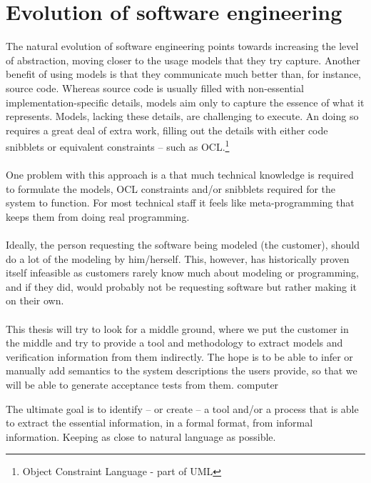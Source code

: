\documentclass[10pt]{scrreprt}
\begin{document}
\section{Evolution of software engineering}
The natural evolution of software engineering points towards increasing the level of abstraction, moving closer to the usage models that they try capture. Another benefit of using models is that they communicate much better than, for instance, source code. Whereas source code is usually filled with non-essential implementation-specific details, models aim only to capture the essence of what it represents. Models, lacking these details, are challenging to execute. An doing so requires a great deal of extra work, filling out the details with either code snibblets or equivalent constraints -- such as OCL.\footnote{Object Constraint Language - part of UML}\\\\
One problem with this approach is a that much technical knowledge is required to formulate the models, OCL constraints and/or snibblets required for the system to function. For most technical staff it feels like meta-programming that keeps them from doing real programming.
\\\\
Ideally, the person requesting the software being modeled (the customer), should do a lot of the modeling by him/herself. This, however, has historically proven itself infeasible as customers rarely know much about modeling or programming, and if they did, would probably not be requesting software but rather making it on their own.
\\\\
This thesis will try to look for a middle ground, where we put the customer in the middle and try to provide a tool and methodology to extract models and verification information from them indirectly. The hope is to be able to infer or manually add semantics to the system descriptions the users provide, so that we will be able to generate acceptance tests from them. computer

The ultimate goal is to identify -- or create --  a tool and/or a process that is able to extract the essential information, in a formal format, from informal information. Keeping as close to natural language as possible.

\end{document}
